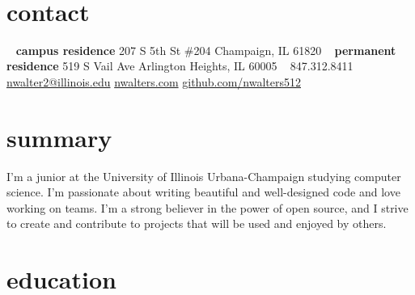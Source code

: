 \documentclass[nofooter,print]{resume}
\begin{document}


\begin{aside} %
~\vspace{-0.42cm} %
\section{contact}
\vspace{-0.16cm} %
~
\textbf{campus residence}
207 S 5th St \#204
Champaign, IL
61820
~
\textbf{permanent residence}
519 S Vail Ave
Arlington Heights, IL
60005
~
847.312.8411
~
\href{mailto:nwalter2@illinois.edu}{nwalter2@illinois.edu}
\href{http://www.nwalters.com}{nwalters.com}
\href{http://github.com/nwalters512}{github.com/nwalters512}
\end{aside}


\section{summary}

I'm a junior at the University of Illinois Urbana-Champaign studying computer science.  I'm passionate about writing beautiful and well-designed code and love working on teams. I'm a strong believer in the power of open source, and I strive to create and contribute to projects that will be used and enjoyed by others.


\section{education}
\end{document}
